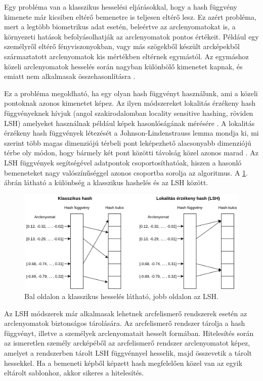 Egy probléma van a klasszikus hesselési eljárásokkal, hogy a hash függvény kimenete már kicsiben eltérő bemenetre is teljesen eltérő lesz. Ez azért probléma, mert a legtöbb biometrikus adat esetén, beleértve az arclenyomatokat is, a környezeti hatások befolyásolhatják az arclenyomatok pontos értékeit. Például egy személyről eltérő fényviszonyokban, vagy más szögekből készült arcképekből származtatott arclenyomatok kis mértékben eltérnek egymástól. Az egymáshoz közeli arclenyomatok hesselés során nagyban különbölő kimenetet kapnak, és emiatt nem alkalmasak összehasonlításra \cite{patel2015cancelable}. 

Ez a probléma megoldható, ha egy olyan hash függvényt használunk, ami a közeli pontoknak azonos kimenetet képez. Az ilyen módszereket lokalitás érzékeny hash függvényeknek hívjuk (angol szakirodalomban locality sensitive hashing, röviden LSH) amelyeket használnak például képek hasonlóságának mérésére \cite{jing2008visualrank}. A lokalitás érzékeny hash függvények létezését a Johnson-Lindenstrauss lemma mondja ki, mi szerint több magas dimenziójú térbeli pont leképezhető alacsonyabb dimenziójú térbe oly módon, hogy bármely két pont közötti távolság közel azonos marad  \cite{johnson1984extensions}. Az LSH függvények segítségével adatpontok csoportosíthatóak, hiszen a hasonló bemeneteket nagy valószínűséggel azonos csoportba sorolja az algoritmus. A \ref{fig:lsh}. ábrán látható a különbség a klasszikus hashelés és az LSH között.

\begin{figure}[ht]
	\centering
	\includegraphics[width=1\columnwidth]{figures/lsh.png}
	\caption{Bal oldalon a klasszikus hesselés látható, jobb oldalon az LSH.}
	\label{fig:lsh}
\end{figure}

Az LSH módszerek már alkalmasak lehetnek arcfelismerő rendszerek esetén az arclenyomatok biztonságos tárolására. Az arcfelismerő rendszer tárolja a hash függvényt, illetve a személyek arclenyomatait hesselt formában. Hitelesítés során az ismeretlen személy arcképéből az arcfelismerő rendszer arclenyomatot képez, amelyet a rendszerben tárolt LSH függvénnyel hesselik, majd összevetik a tárolt hessekkel. Ha a bemeneti képből képzett hash megfelelően közel van az egyik eltárolt sablonhoz, akkor sikeres a hitelesítés.


